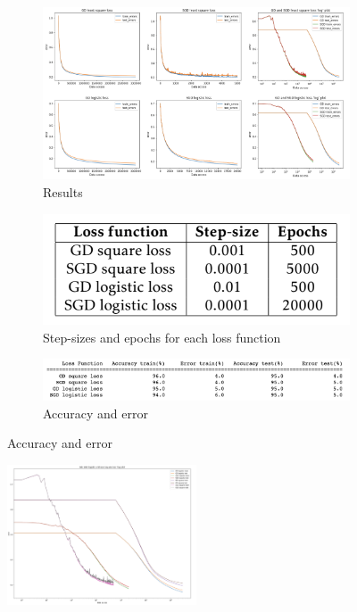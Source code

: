 \documentclass[10pt,a4paper]{article}
\begin{document}
\begin{figure}[h!]
\begin{subfigure}[b]{0.5\textwidth}
\centering
\includegraphics[width = \textwidth]{figures/res}
\caption{Results}
\end{subfigure}
\begin{subfigure}[b]{0.5\textwidth}
\centering
\includegraphics[width = \textwidth]{figures/steps}
\caption{Step-sizes and epochs for each loss function}
\end{subfigure}
\begin{subfigure}[b] {0.5 \textwidth}
\centering
\includegraphics[width = 1.1\textwidth]{figures/acc}
\caption{Accuracy and error}
\end{subfigure}
\end{figure}



\begin{figure}
\centering
\includegraphics[width = 0.5\textwidth]{figures/graph}
\caption{}
\end{figure}
\end{document}
